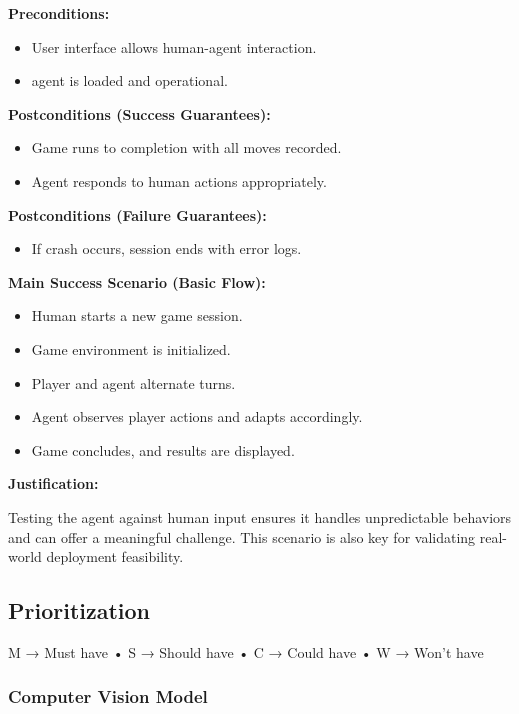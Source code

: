 \documentclass{article}
\begin{document}
\noindent\textbf{Preconditions:}
\begin{itemize}
    \item User interface allows human-agent interaction.
    \item \RL{} agent is loaded and operational.
\end{itemize}

\noindent\textbf{Postconditions (Success Guarantees):}
\begin{itemize}
    \item Game runs to completion with all moves recorded.
    \item Agent responds to human actions appropriately.
\end{itemize}

\noindent\textbf{Postconditions (Failure Guarantees):}
\begin{itemize}
    \item If crash occurs, session ends with error logs.
\end{itemize}

\noindent\textbf{Main Success Scenario (Basic Flow):}
\begin{itemize}
    \item Human starts a new game session.
    \item Game environment is initialized.
    \item Player and \RL{} agent alternate turns.
    \item Agent observes player actions and adapts accordingly.
    \item Game concludes, and results are displayed.
\end{itemize}

\noindent\textbf{Justification:}

Testing the agent against human input ensures it handles unpredictable behaviors and can offer a meaningful challenge. This scenario is also key for validating real-world deployment feasibility.



\subsection{Prioritization}\label{subsec:prioritization}
M → Must have
• S → Should have
• C → Could have
• W → Won't have 

\vspace{1em}

\subsubsection*{Computer Vision Model}
\end{document}
